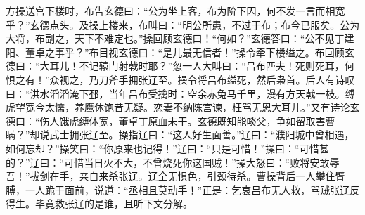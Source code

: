 方操送宫下楼时，布告玄德曰：“公为坐上客，布为阶下囚，何不发一言而相宽乎？”玄德点头。及操上楼来，布叫曰：“明公所患，不过于布；布今已服矣。公为大将，布副之，天下不难定也。”操回顾玄德曰！“何如？”玄德答曰：“公不见丁建阳、董卓之事乎？”布目视玄德曰：“是儿最无信者！”操令牵下楼缢之。布回顾玄德曰：“大耳儿！不记辕门射戟时耶？”忽一人大叫曰：“吕布匹夫！死则死耳，何惧之有！”众视之，乃刀斧手拥张辽至。操令将吕布缢死，然后枭首。后人有诗叹曰：“洪水滔滔淹下邳，当年吕布受擒时：空余赤兔马千里，漫有方天戟一枝。缚虎望宽今太懦，养鹰休饱昔无疑。恋妻不纳陈宫谏，枉骂无恩大耳儿。”又有诗论玄德曰：“伤人饿虎缚体宽，董卓丁原血未干。玄德既知能啖父，争如留取害曹瞒？”却说武士拥张辽至。操指辽曰：“这人好生面善。”辽曰：“濮阳城中曾相遇，如何忘却？”操笑曰：“你原来也记得！”辽曰：“只是可惜！”操曰：“可惜甚的？”辽曰：“可惜当日火不大，不曾烧死你这国贼！”操大怒曰：“败将安敢辱吾！”拔剑在手，亲自来杀张辽。辽全无惧色，引颈待杀。曹操背后一人攀住臂膊，一人跪于面前，说道：“丞相且莫动手！”正是：乞哀吕布无人救，骂贼张辽反得生。毕竟救张辽的是谁，且听下文分解。